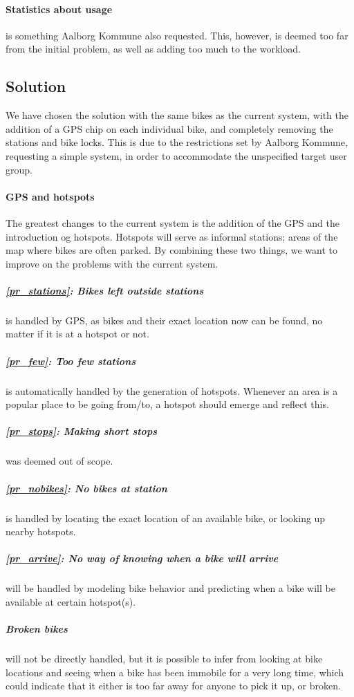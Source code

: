 \paragraph{Statistics about usage} is something Aalborg Kommune also requested.
This, however, is deemed too far from the initial problem, as well as adding too much to the workload.

\subsection{Solution}
We have chosen the solution with the same bikes as the current system, with the addition of a GPS chip on each individual bike, and completely removing the stations and bike locks.
This is due to the restrictions set by Aalborg Kommune, requesting a simple system, in order to accommodate the unspecified target user group.

\paragraph{GPS and hotspots}
The greatest changes to the current system is the addition of the GPS and the introduction og hotspots.
Hotspots will serve as informal stations; areas of the map where bikes are often parked.
By combining these two things, we want to improve on the problems with the current system.

\subparagraph{\ref{pr_stations}: Bikes left outside stations} is handled by GPS, as bikes and their exact location now can be found, no matter if it is at a hotspot or not.

\subparagraph{\ref{pr_few}: Too few stations} is automatically handled by the generation of hotspots.
Whenever an area is a popular place to be going from/to, a hotspot should emerge and reflect this.

\subparagraph{\ref{pr_stops}: Making short stops} was deemed out of scope.

\subparagraph{\ref{pr_nobikes}: No bikes at station} is handled by locating the exact location of an available bike, or looking up nearby hotspots.

\subparagraph{\ref{pr_arrive}: No way of knowing when a bike will arrive} will be handled by modeling bike behavior and predicting when a bike will be available at certain hotspot(s).

\subparagraph{Broken bikes} will not be directly handled, but it is possible to infer from looking at bike locations and seeing when a bike has been immobile for a very long time, which could indicate that it either is too far away for anyone to pick it up, or broken.

